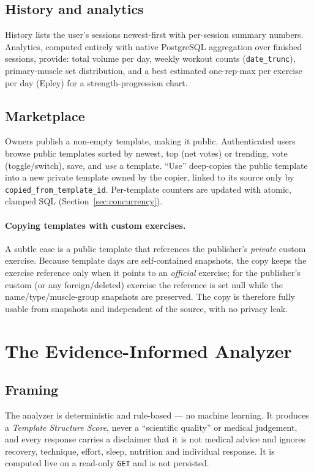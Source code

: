 \documentclass[11pt,a4paper]{article}
\begin{document}
\subsection{History and analytics}
History lists the user's sessions newest-first with per-session summary numbers. Analytics, computed
entirely with native PostgreSQL aggregation over finished sessions, provide: total volume per day,
weekly workout counts (\verb|date_trunc|), primary-muscle set distribution, and a best estimated
one-rep-max per exercise per day (Epley) for a strength-progression chart.

\subsection{Marketplace}
Owners publish a non-empty template, making it public. Authenticated users browse public templates
sorted by newest, top (net votes) or trending, vote (toggle/switch), save, and \emph{use} a
template. ``Use'' deep-copies the public template into a new private template owned by the copier,
linked to its source only by \verb|copied_from_template_id|. Per-template counters are updated with
atomic, clamped SQL (Section~\ref{sec:concurrency}).

\paragraph{Copying templates with custom exercises.}
A subtle case is a public template that references the publisher's \emph{private} custom exercise.
Because template days are self-contained snapshots, the copy keeps the exercise reference only when
it points to an \emph{official} exercise; for the publisher's custom (or any foreign/deleted)
exercise the reference is set null while the name/type/muscle-group snapshots are preserved. The
copy is therefore fully usable from snapshots and independent of the source, with no privacy leak.

\section{The Evidence-Informed Analyzer}

\subsection{Framing}
The analyzer is deterministic and rule-based --- no machine learning. It produces a \emph{Template
Structure Score}, never a ``scientific quality'' or medical judgement, and every response carries a
disclaimer that it is not medical advice and ignores recovery, technique, effort, sleep, nutrition
and individual response. It is computed live on a read-only \verb|GET| and is not persisted.
\end{document}
